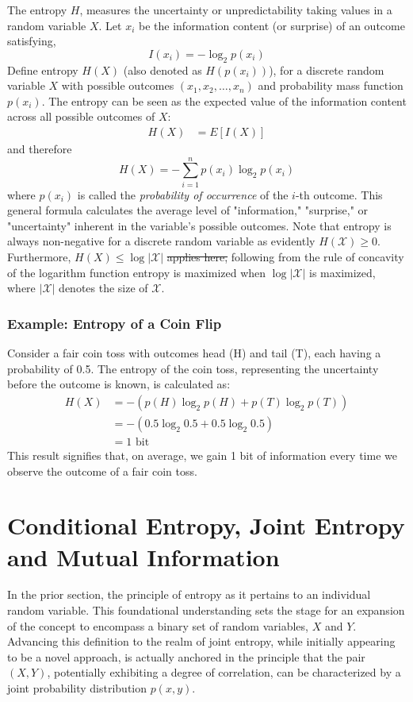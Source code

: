 \documentclass[12pt]{article}
\begin{document}
	The entropy \(H\), measures the uncertainty or unpredictability taking values in a random variable \(X\). Let \(x_i\) be the information content (or surprise) of an outcome satisfying,
	\begin{equation}
		I(x_i) = -\log_2 p(x_i)
	\end{equation}
	Define entropy  \(H(X)\) (also denoted as $H(p(x_i))$), for a discrete random variable $X$ with possible outcomes \((x_1, x_2, \ldots, x_n)\) and probability mass function \(p(x_i)\). The entropy can be seen as the expected value of the information content across all possible outcomes of \(X\):
	\begin{align}
		H(X) &= E[I(X)] 
	\end{align}
	and therefore
	\begin{equation}
		H(X) = -\sum_{i=1}^{n} p(x_i) \log_2 p(x_i)
	\end{equation}
	where \(p(x_i)\) is called the \emph{probability of occurrence} of the \(i\)-th outcome. This general formula calculates the average level of "information," "surprise," or "uncertainty" inherent in the variable's possible outcomes. Note  that entropy is always non-negative for  a discrete random variable as evidently \(H(\mathcal{X}) \geq 0\). Furthermore, \(H(X) \leq \log | \mathcal{X} |\) \st{applies here,} following from the rule of concavity of the logarithm function entropy is maximized when \( \log | \mathcal{X} |\) is maximized, where \(|\mathcal{X} |\) denotes the size of \(\mathcal{X}\).
	
	\subsubsection{Example: Entropy of a Coin Flip}
	
	Consider a fair coin toss with outcomes head (H) and tail (T), each having a probability of 0.5. The entropy of the coin toss, representing the uncertainty before the outcome is known, is calculated as:
	\begin{align}
		H(X) &= -\left( p(H) \log_2 p(H) + p(T) \log_2 p(T) \right) \\
		&= -\left( 0.5 \log_2 0.5 + 0.5 \log_2 0.5 \right) \\
		&= 1 \text{ bit}
	\end{align}
	This result signifies that, on average, we gain 1 bit of information every time we observe the outcome of a fair coin toss.

		\section*{Conditional Entropy, Joint Entropy and Mutual Information}
		In the prior section,  the principle of entropy as it pertains to an individual random variable. This foundational understanding sets the stage for an expansion of the concept to encompass a binary set of random variables, \(X\) and \(Y\). Advancing this definition to the realm of joint entropy, while initially appearing to be a novel approach, is actually anchored in the principle that the pair \((X, Y)\), potentially exhibiting a degree of correlation, can be characterized by a joint probability distribution  \(p(x, y)\).
\end{document}
